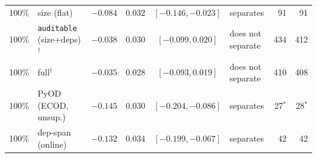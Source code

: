 \begin{table}[t]
\begin{tabular}{@{}llrrclrr@{}}
\midrule
100\% & size (flat) & $-0.084$ & 0.032 & $[-0.146, -0.023]$ & separates & 91 & 91 \\
100\% & \texttt{auditable} (size+deps)$^{\dagger}$ & $-0.038$ & 0.030 & $[-0.099, 0.020]$ & does not separate & 434 & 412 \\
100\% & full$^{\dagger}$ & $-0.035$ & 0.028 & $[-0.093, 0.019]$ & does not separate & 410 & 408 \\
100\% & PyOD (ECOD, unsup.) & $-0.145$ & 0.030 & $[-0.204, -0.086]$ & separates & 27$^{\ast}$ & 28$^{\ast}$ \\
100\% & dep-span (online) & $-0.132$ & 0.034 & $[-0.199, -0.067]$ & separates & 42 & 42 \\
\bottomrule
\end{tabular}
\end{table}

